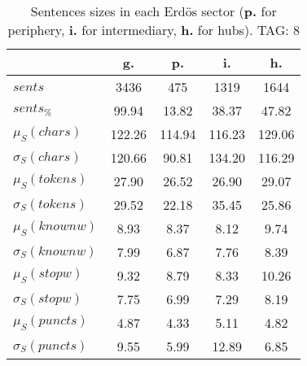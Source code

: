 \begin{table}[h!]
\begin{center}
\begin{tabular}{| l | c | c | c | c |}\hline
 & g. & p. & i. & h. \\\hline
$sents$ & 3436  & 475  & 1319  & 1644 \\\hline
$sents_{\%}$ & 99.94  & 13.82  & 38.37  & 47.82 \\\hline
$\mu_S(chars)$ & 122.26  & 114.94  & 116.23  & 129.06 \\\hline
$\sigma_S(chars)$ & 120.66  & 90.81  & 134.20  & 116.29 \\\hline
$\mu_S(tokens)$ & 27.90  & 26.52  & 26.90  & 29.07 \\\hline
$\sigma_S(tokens)$ & 29.52  & 22.18  & 35.45  & 25.86 \\\hline
$\mu_S(knownw)$ & 8.93  & 8.37  & 8.12  & 9.74 \\\hline
$\sigma_S(knownw)$ & 7.99  & 6.87  & 7.76  & 8.39 \\\hline
$\mu_S(stopw)$ & 9.32  & 8.79  & 8.33  & 10.26 \\\hline
$\sigma_S(stopw)$ & 7.75  & 6.99  & 7.29  & 8.19 \\\hline
$\mu_S(puncts)$ & 4.87  & 4.33  & 5.11  & 4.82 \\\hline
$\sigma_S(puncts)$ & 9.55  & 5.99  & 12.89  & 6.85 \\\hline
\end{tabular}
\caption{Sentences sizes in each Erd\"os sector ({{\bf p.}} for periphery, {{\bf i.}} for intermediary, {{\bf h.}} for hubs). TAG: 8}
\end{center}
\end{table}